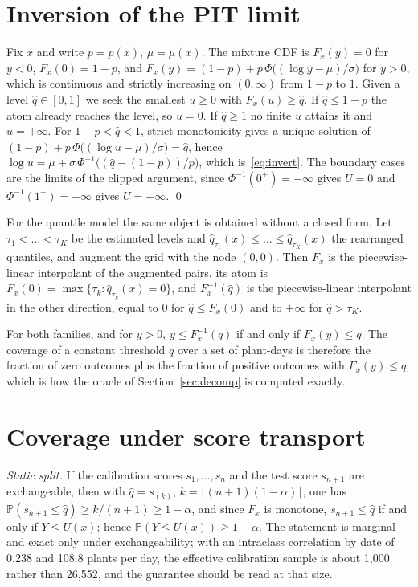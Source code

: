 \appendix

\section{Inversion of the PIT limit}
\label{app:inversion}

Fix $x$ and write $p=p(x)$, $\mu=\mu(x)$. The mixture CDF is $F_x(y)=0$ for $y<0$, $F_x(0)=1-p$, and $F_x(y)=(1-p)+p\,\Phi\big((\log y-\mu)/\sigma\big)$ for $y>0$, which is continuous and strictly increasing on $(0,\infty)$ from $1-p$ to $1$. Given a level $\hat q\in[0,1]$ we seek the smallest $u\ge 0$ with $F_x(u)\ge \hat q$. If $\hat q\le 1-p$ the atom already reaches the level, so $u=0$. If $\hat q\ge 1$ no finite $u$ attains it and $u=+\infty$. For $1-p<\hat q<1$, strict monotonicity gives a unique solution of $(1-p)+p\,\Phi\big((\log u-\mu)/\sigma\big)=\hat q$, hence $\log u=\mu+\sigma\,\Phi^{-1}\big((\hat q-(1-p))/p\big)$, which is~\eqref{eq:invert}. The boundary cases are the limits of the clipped argument, since $\Phi^{-1}(0^+)=-\infty$ gives $U=0$ and $\Phi^{-1}(1^-)=+\infty$ gives $U=+\infty$. \qed

For the quantile model the same object is obtained without a closed form. Let $\tau_1<\dots<\tau_K$ be the estimated levels and $\hat q_{\tau_1}(x)\le\dots\le\hat q_{\tau_K}(x)$ the rearranged quantiles, and augment the grid with the node $(0,0)$. Then $F_x$ is the piecewise-linear interpolant of the augmented pairs, its atom is $F_x(0)=\max\{\tau_k:\hat q_{\tau_k}(x)=0\}$, and $F_x^{-1}(\hat q)$ is the piecewise-linear interpolant in the other direction, equal to $0$ for $\hat q\le F_x(0)$ and to $+\infty$ for $\hat q>\tau_K$.

For both families, and for $y>0$, $y\le F_x^{-1}(q)$ if and only if $F_x(y)\le q$. The coverage of a constant threshold $q$ over a set of plant-days is therefore the fraction of zero outcomes plus the fraction of positive outcomes with $F_x(y)\le q$, which is how the oracle of Section~\ref{sec:decomp} is computed exactly.

\section{Coverage under score transport}
\label{app:coverage}

\emph{Static split.} If the calibration scores $s_1,\dots,s_n$ and the test score $s_{n+1}$ are exchangeable, then with $\hat q=s_{(k)}$, $k=\lceil(n+1)(1-\alpha)\rceil$, one has $\mathbb{P}(s_{n+1}\le\hat q)\ge k/(n+1)\ge 1-\alpha$, and since $F_x$ is monotone, $s_{n+1}\le\hat q$ if and only if $Y\le U(x)$; hence $\mathbb{P}(Y\le U(x))\ge 1-\alpha$. The statement is marginal and exact only under exchangeability; with an intraclass correlation by date of 0.238 and 108.8 plants per day, the effective calibration sample is about 1{,}000 rather than 26{,}552, and the guarantee should be read at that size.

